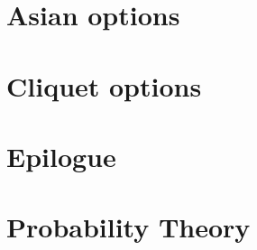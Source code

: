 \documentclass[12pt,a4paper,oneside]{amsbook}
\begin{document}
\chapter{Asian options}
\label{cha:asian}


\chapter{Cliquet options}
\label{cha:cliquet}


\chapter{Epilogue}
\label{cha:epilogue}



\appendix
\chapter{Probability Theory}
\label{cha:probability}



\backmatter

\listoffigures

\listoftables


\printbibliography
\end{document}
